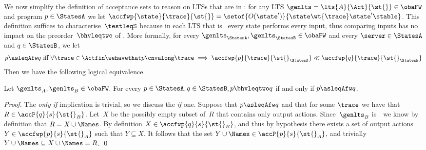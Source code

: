 

We now simplify the definition of acceptance sets to reason on
LTSs that are in \obaFW:
for any LTS $\genlts = \lts{A}{\Act}{ \st{} } \in \obaFW$ and program 
$ \serverA \in \StatesA$ we let
$\accfwp{ \state }{ \trace }{ \st{} } =  \setof{ O(\state') }{ \state
  \wt{ \trace } \state' \stable }$.
This definition suffices to characterise~$\testleqS$ because in each LTS that is \obaFW\ every state performs
every input, thus comparing inputs has no impact on the
preorder~$\bhvleqtwo$ of . More formally,
for every $\genlts_\StatesA, \genlts_\StatesB \in \obaFW$ and every $\server \in \StatesA$ and $\serverB \in \StatesB$,
we let %
$$
\serverA \asleqAfw \serverB \text{ iff } \forall \trace \in \Actfin \wehavethat \serverA \cnvalong \trace \implies \accfwp{ \serverA }{ \trace }{ \st{}_\StatesA } \ll \accfwp{ \serverB }{ \trace }{ \st{}_\StatesB }
$$
Then we have the following logical equivalence.
\begin{lemma}
  \label{lem:conditions-on-accsets-logically-equivalent}
  Let $\genlts_A, \genlts_B \in \obaFW$.
  For every $\serverA \in \StatesA, \serverB \in \StatesB, \serverA \bhvleqtwo \serverB$
  if and only if $\serverA \asleqAfw \serverB$.
\end{lemma}
\begin{proof}
  The {\em only if} implication is trivial, so we discuss the {\em if}
  one. Suppose that $ \serverA \asleqAfw \serverB  $ and that for some
  $\trace$ we have that $R \in \accP{\serverB}{s}{\st{}_B}$. Let~$X$ be
  the possibly empty subset of~$R$ that contains only output actions.
  Since~$\genlts_B$ is~\obaFW\ we know by definition that $R =
  {X} \cup {\Names}$.
  By definition $X \in \accfwp{\serverB}{s}{\st{}_B}$, and thus by
  hypothesis there exists a set of output actions $Y \in
  \accfwp{\serverA}{s}{\st{}_A}$ such that $Y \subseteq X$.
  It follows that the set ${{Y} \cup {\Names}} \in
  \accP{\serverA}{s}{\st{}_A}$, and trivially $Y \cup \Names \subseteq
  {X} \cup {\Names} = R$.
  \qed
\end{proof}





